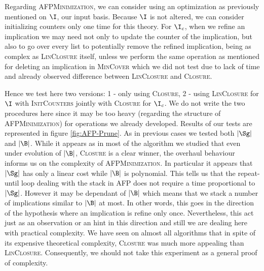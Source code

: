 Regarding \textsc{AFPMinimization}, we can consider using an optimization as
previously mentioned on $\I$, our input basis. Because $\I$ is not altered, we can consider initializing counters only one time for this theory. For $\I_c$, when we refine an implication we may need not only to update the counter of 
the implication, but also to go over every list to potentially remove the
refined implication, being as complex as \textsc{LinClosure} itself, unless we 
perform the same operation as mentioned for deleting an implication in \textsc{MinCover} which we did not test due to lack of time and already observed difference between \textsc{LinClosure} and \textsc{Closure}. 

\vspace{1.2em}

Hence we test here two versions: 1 - only using \textsc{Closure}, 2 - using
\textsc{LinClosure} for $\I$ with \textsc{InitCounters} jointly with 
\textsc{Closure} for $\I_c$. We do not write the two procedures here since
it may be too heavy (regarding the structure of \textsc{AFPMinimization}) for operations we already developed. Results of our tests are represented in 
figure \ref{fig:AFP-Prune}. As in previous cases we tested both $|\Sg|$ and
$|\B|$. While it appears as in most of the algorithm we studied that even
under evolution of $|\B|$, \textsc{Closure} is a clear winner, the overhaul
behaviour informs us on the complexity of \textsc{AFPMinimization}. In particular it appears that $|\Sg|$ has only a linear cost while $|\B|$ is
polynomial. This tells us that the repeat-until loop dealing with the stack
in \textsc{AFP} does not require a time proportional to $|\Sg|$. However it
may be dependant of $|\B|$ which means that we stack a number of implications
similar to $|\B|$ at most. In other words, this goes in the direction of the 
hypothesis where an implication is refine only once. Nevertheless, this act
just as an observation or an hint in this direction and still we are dealing
here with practical complexity. We have seen on almost all algorithms that
in spite of its expensive theoretical complexity, \textsc{Closure} was much
more appealing than \textsc{LinClosure}. Consequently, we should not take
this experiment as a general proof of complexity. 

\vspace{1.2em}

